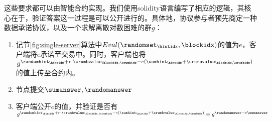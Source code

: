 这些要求都可以由智能合约实现。我们使用solidity语言编写了相应的逻辑，其核心在于，验证答案这一过程是可以公开进行的。具体地，协议参与者预先商定一种数据承诺协议，以及一个求解离散对数困难的群$g$：
\begin{enumerate}
    \item 记节\ref{fig:single-server}算法中$Eval(\randomset_\hintidx, \blockidx)$的值为$e$，客户端将$e$承诺至交易中。同时，客户端也将$g^{\randomhint_\hintidx+r\cdot \crumbvalue_{\blockidx, \crumbidx}-e(\sumhint_\hintidx+\crumbvalue_{\blockidx, \crumbidx})}$的值上传至合约内。
    \item 节点提交$\sumanswer,\randomanswer$
    \item 客户端公开$e$的值，并验证是否有$g^{\randomhint_\hintidx+r\cdot \crumbvalue_{\blockidx, \crumbidx}-e(\sumhint_\hintidx+\crumbvalue_{\blockidx, \crumbidx})}=g^{\randomanswer-e\sumanswer}$
\end{enumerate}

